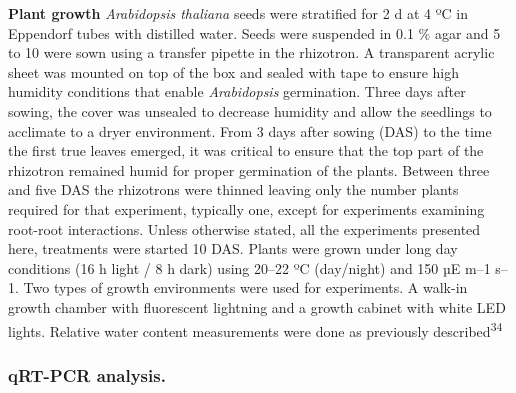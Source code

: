 \documentclass[]{article}
\begin{document}
\textbf{Plant growth} \emph{Arabidopsis thaliana} seeds were stratified
for 2 d at 4 ºC in Eppendorf tubes with distilled water. Seeds were
suspended in 0.1 \% agar and 5 to 10 were sown using a transfer pipette
in the rhizotron. A transparent acrylic sheet was mounted on top of the
box and sealed with tape to ensure high humidity conditions that enable
\emph{Arabidopsis} germination. Three days after sowing, the cover was
unsealed to decrease humidity and allow the seedlings to acclimate to a
dryer environment. From 3 days after sowing (DAS) to the time the first
true leaves emerged, it was critical to ensure that the top part of the
rhizotron remained humid for proper germination of the plants. Between
three and five DAS the rhizotrons were thinned leaving only the number
plants required for that experiment, typically one, except for
experiments examining root-root interactions. Unless otherwise stated,
all the experiments presented here, treatments were started 10 DAS.
Plants were grown under long day conditions (16 h light / 8 h dark)
using 20--22 ºC (day/night) and 150 µE m--1 s--1. Two types of growth
environments were used for experiments. A walk-in growth chamber with
fluorescent lightning and a growth cabinet with white LED lights.
Relative water content measurements were done as previously
described\textsuperscript{34}

\subsubsection{qRT-PCR analysis.}\label{qrt-pcr-analysis.}
\end{document}

